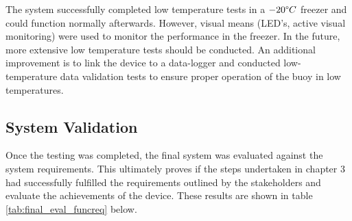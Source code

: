 The system successfully completed low temperature tests in a $-20\degree C$ freezer and could function normally afterwards. However, visual means (LED's, active visual monitoring) were used to monitor the performance in the freezer. In the future, more extensive low temperature tests should be conducted. An additional improvement is to link the device to a data-logger and conducted low-temperature data validation tests to ensure proper operation of the buoy in low temperatures.

\subsection{System Validation}
Once the testing was completed, the final system was evaluated against the system requirements. This ultimately proves if the steps undertaken in chapter 3 had successfully fulfilled the requirements outlined by the stakeholders and evaluate the achievements of the device. These results are shown in table \ref{tab:final_eval_funcreq} below.

